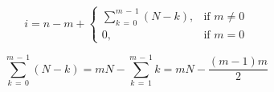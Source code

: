 \documentclass[12pt]{article}
\begin{document}
\begin{equation}
  i = n - m + \begin{cases}
    \displaystyle\sum_{k\,=\,0}^{m\,-\,1}(N-k), &\text{if }m\neq 0\\
    0, &\text{if }m=0
  \end{cases}
\end{equation}

\begin{equation}
  \sum_{k\,=\,0}^{m\,-\,1}(N-k) = mN - \sum_{k\,=\,1}^{m\,-\,1}k = mN - \frac{(m-1)m}{2}
\end{equation}
\end{document}
